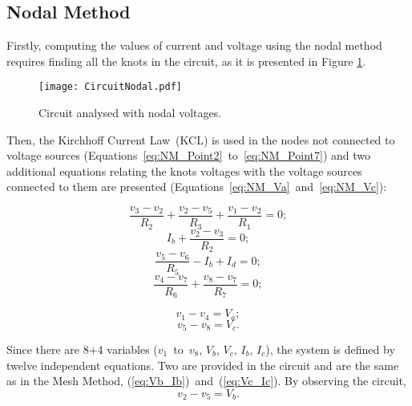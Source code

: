 \subsection{Nodal Method}

Firstly, computing the values of current and voltage using the nodal method requires finding all the knots in the circuit, as it is presented in Figure \ref{fig:Circuit_Nodal}.
\begin{figure}[h] \centering
\texttt{[image: CircuitNodal.pdf]}
\caption{Circuit analysed with nodal voltages.}
\label{fig:Circuit_Nodal}
\end{figure}

Then, the Kirchhoff Current Law~(KCL) is used in the nodes not connected to voltage sources (Equations~\ref{eq:NM_Point2}~to~\ref{eq:NM_Point7}) and two additional equations relating the knots voltages with the voltage sources connected to them are presented (Equations~\ref{eq:NM_Va}~and~\ref{eq:NM_Vc}):

\begin{equation}
  \frac{v_3-v_2}{R_2} + \frac{v_2-v_5}{R_3} + \frac{v_1-v_2}{R_1} = 0;
  \label{eq:NM_Point2}
\end{equation}
\begin{equation}
  I_b + \frac{v_2-v_3}{R_2} = 0;	
  \label{eq:NM_Point3}
\end{equation}
\begin{equation}
  \frac{v_5-v_6}{R_5} - I_b + I_d = 0;
  \label{eq:NM_Point6}
\end{equation}
\begin{equation}
  \frac{v_4-v_7}{R_6} + \frac{v_8-v_7}{R_7} = 0;
  \label{eq:NM_Point7}
\end{equation}

\begin{equation}
  v_1 - v_4 = V_a;
  \label{eq:NM_Va}
\end{equation}
\begin{equation}
  v_5 - v_8 = V_c.
  \label{eq:NM_Vc}
\end{equation}

Since there are 8+4 variables ($v_1$~to~$v_8$, $V_b$, $V_c$, $I_b$, $I_c$), the system is defined by twelve independent equations. Two are provided in the circuit and are the same as in the Mesh Method, (\ref{eq:Vb_Ib})~and~(\ref{eq:Vc_Ic}).
By observing the circuit,
\begin{equation}
  v_2 - v_5 = V_b.
  \label{eq:NM_Vb}
\end{equation}

